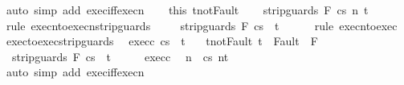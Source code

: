 \begin{isabellebody}
\ {\isacharparenleft}auto\ simp\ add{\isacharcolon}\ exec{\isacharunderscore}iff{\isacharunderscore}execn{\isacharparenright}\isanewline
\ \ \isamarkupfalse%
\ this\ t{\isacharunderscore}not{\isacharunderscore}Fault\isanewline
\ \ \isamarkupfalse%
\ {\isachardoublequoteopen}{\isasymGamma}{\isasymturnstile}{\isasymlangle}strip{\isacharunderscore}guards\ F\ c{\isacharcomma}s{\isasymrangle}\ {\isacharequal}n{\isasymRightarrow}\ t{\isachardoublequoteclose}\isanewline
\ \ \ \ \isamarkupfalse%
\ {\isacharparenleft}rule\ execn{\isacharunderscore}to{\isacharunderscore}execn{\isacharunderscore}strip{\isacharunderscore}guards\ {\isacharparenright}\isanewline
\ \ \isamarkupfalse%
\ {\isachardoublequoteopen}{\isasymGamma}{\isasymturnstile}{\isasymlangle}strip{\isacharunderscore}guards\ F\ c{\isacharcomma}s{\isasymrangle}\ {\isasymRightarrow}\ t{\isachardoublequoteclose}\isanewline
\ \ \ \ \isamarkupfalse%
\ {\isacharparenleft}rule\ execn{\isacharunderscore}to{\isacharunderscore}exec{\isacharparenright}\isanewline
{}\isamarkupfalse%
%
\endisatagproof
{\isafoldproof}%
%
\isadelimproof
\isanewline
%
\endisadelimproof
\isanewline
{}\isamarkupfalse%
\ exec{\isacharunderscore}to{\isacharunderscore}exec{\isacharunderscore}strip{\isacharunderscore}guards{\isacharprime}{\isacharcolon}\isanewline
\ \ exec{\isacharunderscore}c{\isacharcolon}\ {\isachardoublequoteopen}{\isasymGamma}{\isasymturnstile}{\isasymlangle}c{\isacharcomma}s{\isasymrangle}\ {\isasymRightarrow}\ t{\isachardoublequoteclose}\ \isanewline
\ \ t{\isacharunderscore}not{\isacharunderscore}Fault{\isacharcolon}\ {\isachardoublequoteopen}t\ {\isasymnotin}\ Fault\ {\isacharbackquote}\ F{\isachardoublequoteclose}\isanewline
\ \ {\isachardoublequoteopen}{\isasymGamma}{\isasymturnstile}{\isasymlangle}strip{\isacharunderscore}guards\ F\ c{\isacharcomma}s{\isasymrangle}\ {\isasymRightarrow}\ t{\isachardoublequoteclose}\isanewline
%
\isadelimproof
%
\endisadelimproof
%
\isatagproof
{}\isamarkupfalse%
\ {\isacharminus}\isanewline
\ \ \isamarkupfalse%
\ exec{\isacharunderscore}c\ \isamarkupfalse%
\ n\ \ {\isachardoublequoteopen}{\isasymGamma}{\isasymturnstile}{\isasymlangle}c{\isacharcomma}s{\isasymrangle}\ {\isacharequal}n{\isasymRightarrow}t{\isachardoublequoteclose}\ \isanewline
\ \ \ \ \isamarkupfalse%
\ {\isacharparenleft}auto\ simp\ add{\isacharcolon}\ exec{\isacharunderscore}iff{\isacharunderscore}execn{\isacharparenright}\isanewline

\end{isabellebody}

